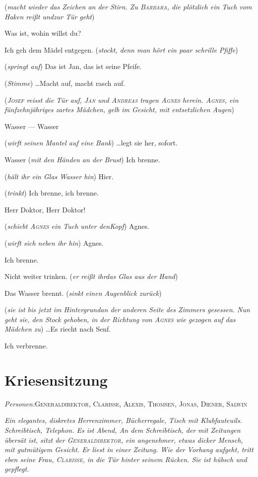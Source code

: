 \documentclass[
	final,
	a4paper,
	ngerman,
	mpinclude = true, %
	twoside = true,
	open = right,
	cleardoublepage = plain,
	DIV = 13,
	BCOR = 1cm,
	titlepage = firstiscover,
	]{scrbook}
\newcommand{\marginnote}[1]{\marginpar{\singlespacing\raggedright\footnotesize#1}}
\newcommand{\scene}{\setcounter{subscene}{1}\section}
\newcommand{\direction}[1]{(\textit{#1})}
\newcommand{\setting}[1]{\vspace{-0.5\baselineskip}\centering\textit{#1}}
\newcounter{subscene}
\newcommand{\characterlist}[1]{{\begin{center}\textit{Personen:}\quad{}#1\end{center}}}
\newcommand{\thecharacter}[1]{\textup{\textsc{#1}}\xspace}
\newcommand{\theBarbara}{\thecharacter{Barbara}}
\newcommand{\theJosef}{\thecharacter{Josef}}
\newcommand{\theKathrine}{\thecharacter{Kathrine}}
\newcommand{\theJan}{\thecharacter{Jan}}
\newcommand{\theAndreas}{\thecharacter{Andreas}}
\newcommand{\theLuise}{\thecharacter{Luise}}
\newcommand{\theAgnes}{\thecharacter{Agnes}}
\newcommand{\theGeneraldirektor}{\thecharacter{Generaldirektor}}
\newcommand{\theClarisse}{\thecharacter{Clarisse}}
\newcommand{\theAlexis}{\thecharacter{Alexis}}
\newcommand{\theThomsen}{\thecharacter{Thomsen}}
\newcommand{\theJonas}{\thecharacter{Jonas}}
\newcommand{\theSalwin}{\thecharacter{Salwin}}
\newcommand{\theDiener}{\thecharacter{Diener}}
\newcommand{\character}[1]{\item[#1]}
\newcommand{\Barbara}{\character{\theBarbara}}
\newcommand{\Josef}{\character{\theJosef}}
\newcommand{\Kathrine}{\character{\theKathrine}}
\newcommand{\Andreas}{\character{\theAndreas}}
\newcommand{\Luise}{\character{\theLuise}}
\newcommand{\Agnes}{\character{\theAgnes}}
\newcommand{\Thomsen}{\character{\theThomsen}}
\begin{document}
\begin{play}
\direction{macht wieder das Zeichen an der Stirn. Zu \theBarbara, die plötzlich ein Tuch vom Haken reißt undzur Tür geht}

Was ist, wohin willst du?

\Barbara
Ich geh dem Mädel entgegen. \direction{stockt, denn man hört ein paar schrille Pfiffe}

\Luise
\direction{springt auf} Das ist Jan, das ist seine Pfeife.

\Andreas
\direction{Stimme}
\ldots Macht auf, macht rasch auf.

\direction{\theJosef reisst die Tür auf, \theJan und \theAndreas tragen \theAgnes herein. \theAgnes, ein fünfzehnjähriges zartes Mädchen, gelb im Gesicht, mit entsetzlichen Augen}

\Agnes
Wasser --- Wasser

\Thomsen
\direction{wirft seinen Mantel auf eine Bank} \ldots legt sie her, sofort.

\Agnes
Wasser \direction{mit den Händen an der Brust} Ich brenne.

\Luise
\direction{hält ihr ein Glas Wasser hin} Hier.

\Agnes
\direction{trinkt} Ich brenne, ich brenne.

\Josef
Herr Doktor, Herr Doktor!

\Barbara
\direction{schiebt \theAgnes ein Tuch unter denKopf} Agnes.

\Andreas
\direction{wirft sich neben ihr hin} Agnes.

\Agnes
Ich brenne.

\Thomsen
Nicht weiter trinken. \direction{er reißt ihrdas Glas aus der Hand}

\Agnes
Das Wasser brennt. \direction{sinkt einen Augenblick zurück}

\Kathrine
\direction{sie ist bis jetzt im Hintergrundan der anderen Seite des Zimmers gesessen. Nun geht sie, den Stock gehoben, in der Richtung von \theAgnes wie gezogen auf das Mädchen zu} \ldots Es riecht nach Senf.

\Agnes
Ich verbrenne.

\end{play}



\scene{Kriesensitzung}
\label{scene:II}
\characterlist{\theGeneraldirektor, \theClarisse, \theAlexis, \theThomsen, \theJonas, \theDiener, \theSalwin}
\marginnote{Ledersessel}
\setting{Ein elegantes, diskretes Herrenzimmer, Bücherregale, Tisch mit Klubfauteuils. Schreibtisch, Telephon. Es ist Abend, An dem Schreibtisch, der mit Zeitungen übersät ist, sitzt der \theGeneraldirektor, ein angenehmer, etwas dicker Mensch, mit gutmütigem Gesicht. Er liest in einer Zeitung. Wie der Vorhang aufgeht, tritt eben seine Frau, \theClarisse, in die Tür hinter seinem Rücken. Sie ist hübsch und gepflegt.}
\end{document}
